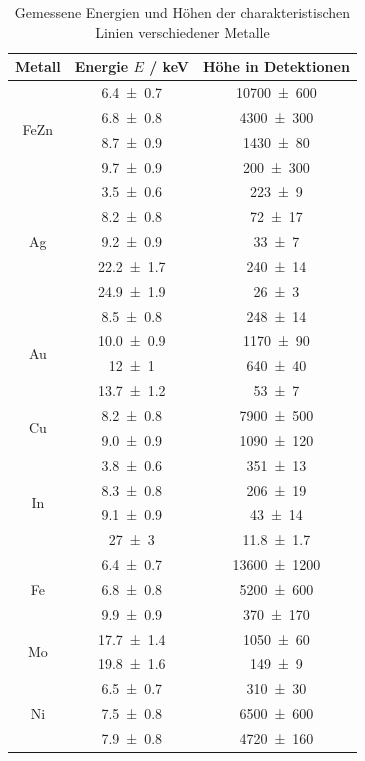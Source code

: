 \begin{table}[H]
    \centering
    \caption{Gemessene Energien und Höhen der charakteristischen Linien verschiedener Metalle}
    \label{tab:energien-charakeristische-linien}
    \begin{tabular}{c|c|c}
        Metall & Energie $E$ / \unit{\kilo\electronvolt} & Höhe in Detektionen \\\hline\multirow{4}{*}{FeZn} & \num{6.4\pm 0.7} & \num{10700\pm 600} \\ & \num{6.8\pm 0.8} & \num{4300\pm 300} \\ & \num{8.7\pm 0.9} & \num{1430\pm 80} \\ & \num{9.7\pm 0.9} & \num{200\pm 300} \\\hline
\multirow{5}{*}{Ag} & \num{3.5\pm 0.6} & \num{223\pm 9} \\ & \num{8.2\pm 0.8} & \num{72\pm 17} \\ & \num{9.2\pm 0.9} & \num{33\pm 7} \\ & \num{22.2\pm 1.7} & \num{240\pm 14} \\ & \num{24.9\pm 1.9} & \num{26\pm 3} \\\hline
\multirow{4}{*}{Au} & \num{8.5\pm 0.8} & \num{248\pm 14} \\ & \num{10.0\pm 0.9} & \num{1170\pm 90} \\ & \num{12\pm 1} & \num{640\pm 40} \\ & \num{13.7\pm 1.2} & \num{53\pm 7} \\\hline
\multirow{2}{*}{Cu} & \num{8.2\pm 0.8} & \num{7900\pm 500} \\ & \num{9.0\pm 0.9} & \num{1090\pm 120} \\\hline
\multirow{4}{*}{In} & \num{3.8\pm 0.6} & \num{351\pm 13} \\ & \num{8.3\pm 0.8} & \num{206\pm 19} \\ & \num{9.1\pm 0.9} & \num{43\pm 14} \\ & \num{27\pm 3} & \num{11.8\pm 1.7} \\\hline
\multirow{3}{*}{Fe} & \num{6.4\pm 0.7} & \num{13600\pm 1200} \\ & \num{6.8\pm 0.8} & \num{5200\pm 600} \\ & \num{9.9\pm 0.9} & \num{370\pm 170} \\\hline
\multirow{2}{*}{Mo} & \num{17.7\pm 1.4} & \num{1050\pm 60} \\ & \num{19.8\pm 1.6} & \num{149\pm 9} \\\hline
\multirow{3}{*}{Ni} & \num{6.5\pm 0.7} & \num{310\pm 30} \\ & \num{7.5\pm 0.8} & \num{6500\pm 600} \\ & \num{7.9\pm 0.8} & \num{4720\pm 160} \\\hline

\end{tabular}
\end{table}
